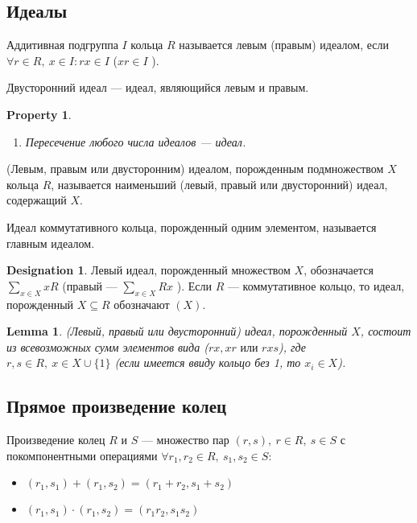 \documentclass[11pt]{book}
\newcommand{\slim}{\sum\limits}
\theoremstyle{definition}
\theoremstyle{plain}
\theoremstyle{plain}
\newtheorem{lm}{Lemma}
\newtheorem*{prop}{Property}
\theoremstyle{definition}
\newtheorem*{name}{Designation}
\theoremstyle{remark}
\begin{document}
\subsection{Идеалы}
\begin{defn}
    Аддитивная подгруппа $ I$ кольца  $ R$ называется  {\sf левым (правым) идеалом}, если  $ \forall r \in R, ~ x \in I: rx \in I$ ($ xr \in  I$ ).

    {\sf Двусторонний идеал} --- идеал, являющийся левым и правым.
\end{defn}
\begin{prop}
    $ $
    \begin{enumerate}[noitemsep]
	\item Пересечение любого числа идеалов --- идеал.
    \end{enumerate}
\end{prop}
\begin{defn}
    (Левым, правым или двусторонним) {\sf идеалом, порожденным подмножеством} $ X$ кольца  $ R$, называется наименьший (левый, правый или двусторонний) идеал, содержащий $ X$.

    Идеал коммутативного кольца, порожденный одним элементом, называется {\sf главным идеалом}.
\end{defn}
\begin{name}
    Левый идеал, порожденный множеством $ X$, обозначается $ \sum\limits_{x \in X} xR$ (правый --- $ \slim_{x \in X} Rx$ ). Если $ R$ --- коммутативное кольцо, то идеал, порожденный  $ X \subseteq R$ обозначают $ (X)$.
\end{name}
\begin{lm}
    (Левый, правый или двусторонний) идеал, порожденный $ X$, состоит из всевозможных сумм элементов вида  ($ rx, xr \text{ или } rxs$), где $ r, s \in R, ~ x \in X \cup \{1\}$ (если имеется ввиду кольцо без 1, то $ x_i \in X$).
\end{lm}
\subsection{Прямое произведение колец}
\begin{defn}
    {\sf Произведение колец} $ R$ и  $ S$  --- множество пар $ (r, s), ~ r \in R, ~ s \in S$ с покомпонентными  операциями $\forall r_1, r_2 \in R, ~ s_1, s_2 \in S$:
    \begin{itemize}
	\item $ (r_1, s_1) + (r_1, s_2)  = (r_1+r_2, s_1 + s_2)$
	\item $ (r_1, s_1) \cdot  (r_1, s_2)  = (r_1r_2, s_1  s_2)$
    \end{itemize}
\end{defn}
\end{document}
